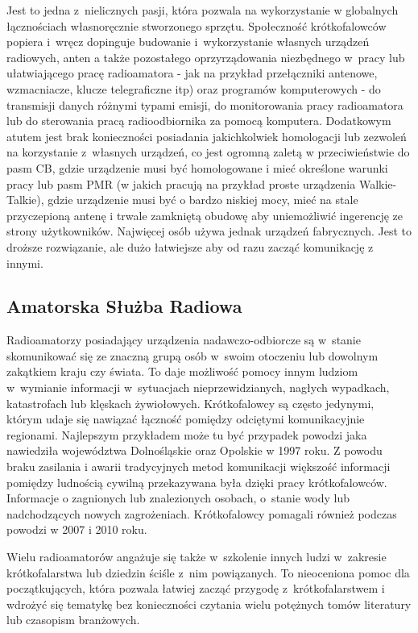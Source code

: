 \documentclass[]{mgr}
\begin{document}
            Jest to jedna z~nielicznych pasji, która pozwala na wykorzystanie w globalnych łącznościach własnoręcznie stworzonego sprzętu. Społeczność krótkofalowców popiera i~wręcz dopinguje budowanie i~wykorzystanie własnych urządzeń radiowych, anten a także pozostałego oprzyrządowania niezbędnego w~pracy lub ułatwiającego pracę radioamatora - jak na przykład przełączniki antenowe, wzmacniacze, klucze telegraficzne itp) oraz programów komputerowych - do transmisji danych różnymi typami emisji, do monitorowania pracy radioamatora lub do sterowania pracą radioodbiornika za pomocą komputera. Dodatkowym atutem jest brak konieczności posiadania jakichkolwiek homologacji lub zezwoleń na korzystanie z~własnych urządzeń, co jest ogromną zaletą w przeciwieństwie do pasm CB, gdzie urządzenie musi być homologowane i mieć określone warunki pracy lub pasm PMR (w jakich pracują na przykład proste urządzenia Walkie-Talkie), gdzie urządzenie musi być o bardzo niskiej mocy, mieć na stale przyczepioną antenę i trwale zamkniętą obudowę aby uniemożliwić ingerencję ze strony użytkowników. Najwięcej osób używa jednak urządzeń fabrycznych. Jest to droższe rozwiązanie, ale dużo łatwiejsze aby od razu zacząć komunikację z innymi.

            \subsection{Amatorska Służba Radiowa}
            Radioamatorzy posiadający urządzenia nadawczo-odbiorcze są w~stanie skomunikować się ze znaczną grupą osób w~swoim otoczeniu lub dowolnym zakątkiem kraju czy świata. To daje możliwość pomocy innym ludziom w~wymianie informacji w~sytuacjach nieprzewidzianych, nagłych wypadkach, katastrofach lub klęskach żywiołowych. Krótkofalowcy są często jedynymi, którym udaje się nawiązać łączność pomiędzy odciętymi komunikacyjnie regionami. Najlepszym przykładem może tu być przypadek powodzi jaka nawiedziła województwa Dolnośląskie oraz Opolskie w 1997 roku. Z powodu braku zasilania i awarii tradycyjnych metod komunikacji większość informacji pomiędzy ludnością cywilną przekazywana była dzięki pracy krótkofalowców. Informacje o zagnionych lub znalezionych osobach, o~stanie wody lub nadchodzących nowych zagrożeniach. Krótkofalowcy pomagali również podczas powodzi w 2007 i 2010 roku.

            Wielu radioamatorów angażuje się także w~szkolenie innych ludzi w~zakresie krótkofalarstwa lub dziedzin ściśle z~nim powiązanych. To nieoceniona pomoc dla początkujących, która pozwala łatwiej zacząć przygodę z~krótkofalarstwem i wdrożyć się tematykę bez konieczności czytania wielu potężnych tomów literatury lub czasopism branżowych.
\end{document}
